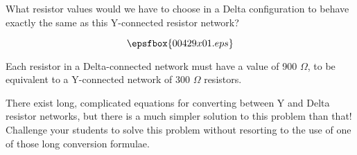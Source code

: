 

What resistor values would we have to choose in a Delta configuration to behave exactly the same as this Y-connected resistor network? 

$$\epsfbox{00429x01.eps}$$







Each resistor in a Delta-connected network must have a value of 900 $\Omega$, to be equivalent to a Y-connected network of 300 $\Omega$ resistors.







There exist long, complicated equations for converting between Y and Delta resistor networks, but there is a much simpler solution to this problem than that!  Challenge your students to solve this problem without resorting to the use of one of those long conversion formulae.




